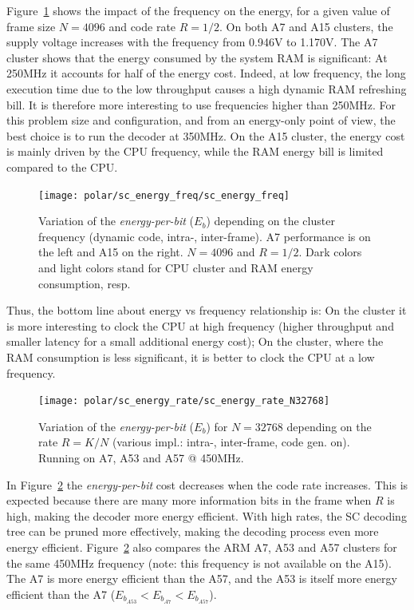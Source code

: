 Figure~\ref{plot:polar_sc_energy_freq} shows the impact of the frequency on the
energy, for a given value of frame size $N=4096$ and code rate $R=1/2$. On both
A7 and A15 clusters, the supply voltage increases with the frequency from 0.946V
to 1.170V. The A7 \little cluster shows that the energy consumed by the system
RAM is significant: At 250MHz it accounts for half of the energy cost. Indeed,
at low frequency, the long execution time due to the low throughput causes a
high dynamic RAM refreshing bill. It is therefore more interesting to use
frequencies higher than 250MHz. For this problem size and configuration, and
from an energy-only point of view, the best choice is to run the decoder at
350MHz. On the A15 \big cluster, the energy cost is mainly driven by the CPU
frequency, while the RAM energy bill is limited compared to the CPU.

\begin{figure}
  \centering
  \texttt{[image: polar/sc\_energy\_freq/sc\_energy\_freq]}
  \caption{Variation of the \emph{energy-per-bit} ($E_b$) depending on the cluster
    frequency (dynamic code, intra-, inter-frame).
    A7 performance is on the left and A15 on the right. $N = 4096$ and $R = 1/2$.
    Dark colors and light colors stand for CPU cluster and RAM energy consumption,
    resp.}
  \label{plot:polar_sc_energy_freq}
\end{figure}

Thus, the bottom line about energy vs frequency relationship is: On the \little
cluster it is more interesting to clock the CPU at high frequency (higher
throughput and smaller latency for a small additional energy cost); On the
\big cluster, where the RAM consumption is less significant, it is better to
clock the CPU at a low frequency.

\begin{figure}
  \centering
  \texttt{[image: polar/sc\_energy\_rate/sc\_energy\_rate\_N32768]}
  \caption{Variation of the \emph{energy-per-bit} ($E_b$) for $N = 32768$
    depending on the rate $R = K / N$ (various impl.: intra-, inter-frame, code
    gen. on). Running on A7, A53 and A57 @ 450MHz.}
  \label{plot:polar_sc_energy_rate}
\end{figure}

In Figure~\ref{plot:polar_sc_energy_rate} the \emph{energy-per-bit} cost
decreases when the code rate increases. This is expected because there are many
more information bits in the frame when $R$ is high, making the decoder more
energy efficient. With high rates, the SC decoding tree can be pruned more
effectively, making the decoding process even more energy efficient.
Figure~\ref{plot:polar_sc_energy_rate} also compares the ARM A7, A53 and A57
clusters for the same 450MHz frequency (note: this frequency is not available on
the A15). The \little A7 is more energy efficient than the \big A57, and the
\little A53 is itself more energy efficient than the \little A7
($E_{b_{A53}} < E_{b_{A7}} < E_{b_{A57}}$).

